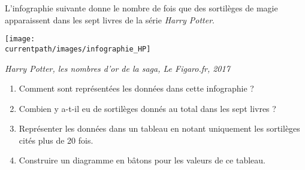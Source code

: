 \begin{exercice*}
   L'infographie suivante donne le nombre de fois que des sortilèges de magie apparaissent dans les sept livres de la série {\it Harry Potter}.
   \begin{center}
      \texttt{[image: \\currentpath/images/infographie\_HP]}

      \hfill {\footnotesize\it Harry Potter, les nombres d'or de la saga, Le Figaro.fr, 2017}
   \end{center}
   \begin{enumerate}
      \item Comment sont représentées les données dans cette infographie ?
      \item Combien y a-t-il eu de sortilèges donnés au total dans les sept livres ?
      \item Représenter les données dans un tableau en notant uniquement les sortilèges cités plus de 20 fois.
      \item Construire un diagramme en bâtons pour les valeurs de ce tableau.
   \end{enumerate}   
\end{exercice*}
